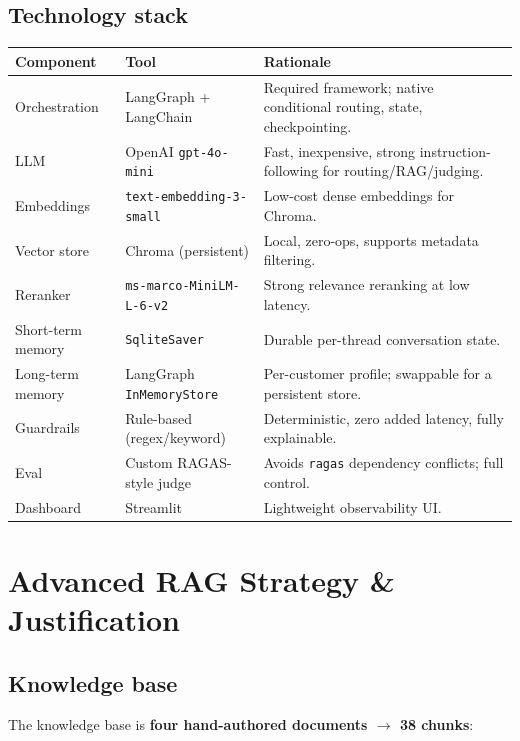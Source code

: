 \documentclass[11pt,a4paper]{article}
\newcommand{\code}[1]{\texttt{#1}}
\begin{document}
\subsection{Technology stack}
\begin{tabularx}{\textwidth}{@{}>{\raggedright\arraybackslash}p{2.7cm}>{\raggedright\arraybackslash}p{3.5cm}Y@{}}
\toprule
\textbf{Component} & \textbf{Tool} & \textbf{Rationale} \\
\midrule
Orchestration      & LangGraph + LangChain          & Required framework; native conditional routing, state, checkpointing. \\
LLM                & OpenAI \code{gpt-4o-mini}      & Fast, inexpensive, strong instruction-following for routing/RAG/judging. \\
Embeddings         & \code{text-embedding-3-small}  & Low-cost dense embeddings for Chroma. \\
Vector store       & Chroma (persistent)            & Local, zero-ops, supports metadata filtering. \\
Reranker           & \code{ms-marco-MiniLM-L-6-v2}  & Strong relevance reranking at low latency. \\
Short-term memory  & \code{SqliteSaver}             & Durable per-thread conversation state. \\
Long-term memory   & LangGraph \code{InMemoryStore} & Per-customer profile; swappable for a persistent store. \\
Guardrails         & Rule-based (regex/keyword)     & Deterministic, zero added latency, fully explainable. \\
Eval               & Custom RAGAS-style judge        & Avoids \code{ragas} dependency conflicts; full control. \\
Dashboard          & Streamlit                      & Lightweight observability UI. \\
\bottomrule
\end{tabularx}

\section{Advanced RAG \textemdash{} Strategy \& Justification}

\subsection{Knowledge base}
The knowledge base is \textbf{four hand-authored documents $\to$ 38 chunks}:
\end{document}
